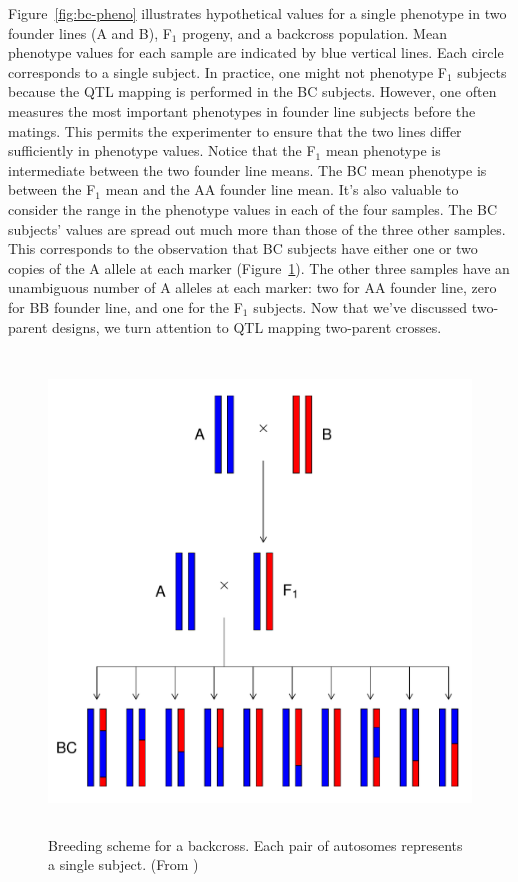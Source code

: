 \documentclass[oneside]{book}\usepackage[]{graphicx}\usepackage[]{color}
\makeatletter
\def\maxwidth{ %
  \ifdim\Gin@nat@width>\linewidth
    \linewidth
  \else
    \Gin@nat@width
  \fi
}
\newenvironment{knitrout}{}{} %
\def\maxwidth{\ifdim\Gin@nat@width>\linewidth\linewidth\else\Gin@nat@width\fi}
\makeatother
\begin{document}
Figure~\ref{fig:bc-pheno} illustrates hypothetical values for a single phenotype
in two founder lines (A and B), F$_1$ progeny, and a backcross population. 
Mean phenotype values for each sample are indicated by blue vertical lines. 
Each circle corresponds to a single subject.
In practice, one might not phenotype F$_1$ subjects because the QTL mapping is performed in
the BC subjects. 
However, one often measures the most important phenotypes in founder line subjects before 
the matings. This permits the experimenter to ensure that the two lines differ 
sufficiently in phenotype values. Notice that the F$_1$ mean phenotype is intermediate
between the two founder line means. The BC mean phenotype is between the F$_1$ mean and the
AA founder line mean. It's also valuable to consider the range in the phenotype values in each 
of the four samples. The BC subjects' values are spread out much more than those of the 
three other samples. This corresponds to the observation that BC subjects have either one 
or two copies of the A allele at each marker (Figure~\ref{fig:backcross}). 
The other three samples have an unambiguous
number of A alleles at each marker: two for AA founder line, zero for BB founder line, and
one for the F$_1$ subjects. Now that we've discussed
two-parent designs, we turn attention to QTL mapping two-parent crosses.









\begin{knitrout}
\color{fgcolor}\begin{figure}
\includegraphics[width=\maxwidth,height=5in]{figure/backcross-1} \caption[Breeding scheme for a backcross]{Breeding scheme for a backcross. Each pair of autosomes represents a single subject. (From \citet{broman2009guide})}\label{fig:backcross}
\end{figure}


\end{knitrout}
\end{document}
